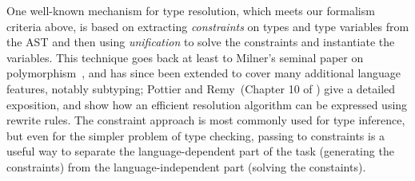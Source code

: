 One well-known mechanism for type resolution, which meets our formalism criteria
above, is based on extracting {\it constraints} on types and type variables from
the AST and then using {\it unification} to solve the constraints and
instantiate the variables.
This technique goes back at least to Milner's seminal paper on
polymorphism~\cite{Milner78:0}, and has since been extended to cover many
additional language features, notably subtyping; Pottier and Remy~(Chapter 10 of
\cite{Pierce05advancedtopics}) give a detailed exposition, and show how an
efficient resolution algorithm can be expressed using rewrite rules.
The constraint approach is most commonly used for type inference, but even for
the simpler problem of type checking, passing to constraints is a useful way to
separate the language-dependent part of the task (generating the constraints)
from the language-independent part (solving the constaints).

